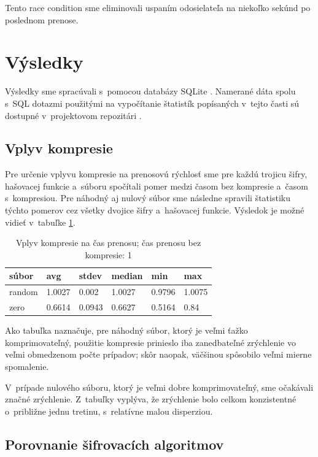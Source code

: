 \documentclass[12pt,a4paper]{article}
\begin{document}
Tento race condition sme eliminovali uspaním odosielateľa na niekoľko
sekúnd po poslednom prenose.

\section{Výsledky}

Výsledky sme spracúvali s~pomocou databázy SQLite \cite{sqlite}. Namerané
dáta spolu s~SQL dotazmi použitými na vypočítanie štatistík popísaných
v~tejto časti sú dostupné v~projektovom repozitári \cite{proj}.

\subsection{Vplyv kompresie}

Pre určenie vplyvu kompresie na prenosovú rýchlosť sme pre každú trojicu
šifry, hašovacej funkcie a~súboru spočítali pomer medzi časom bez
kompresie a~časom s~kompresiou. Pre náhodný aj nulový súbor sme následne
spravili štatistiku týchto pomerov cez všetky dvojice šifry a~hašovacej
funkcie. Výsledok je možné vidieť v~tabuľke \ref{tbl:compression}.

\begin{table}[h]\centering
    \begin{tabular}{|l||l|l|l|l|l|}
        \hline
        \bf súbor & \bf  avg & \bf stdev & \bf median & \bf min & \bf max \\ \hline 
        random & 1.0027 & 0.002 & 1.0027 & 0.9796 & 1.0075 \\ \hline
        zero & 0.6614 & 0.0943 & 0.6627 & 0.5164 & 0.84\\ \hline
    \end{tabular}
    \caption{Vplyv kompresie na čas prenosu; čas prenosu bez kompresie: 1}
    \label{tbl:compression}
\end{table}

Ako tabuľka naznačuje, pre náhodný súbor, ktorý je veľmi ťažko
komprimovateľný, použitie kompresie prinieslo iba zanedbateľné zrýchlenie
vo veľmi obmedzenom počte prípadov; skôr naopak, väčšinou spôsobilo veľmi
mierne spomalenie.

V~prípade nulového súboru, ktorý je veľmi dobre komprimovateľný, sme
očakávali značné zrýchlenie. Z~tabuľky vyplýva, že zrýchlenie bolo celkom
konzistentné o~približne jednu tretinu, s~relatívne malou disperziou.

\subsection{Porovnanie šifrovacích algoritmov}
\label{sec:cipher-comparison}
\end{document}
